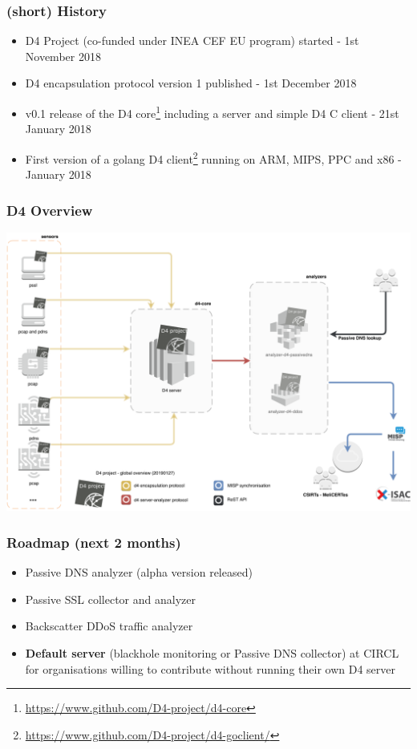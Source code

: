 \documentclass{beamer}
\begin{document}
\begin{frame}
        \frametitle{(short) History}
 \begin{itemize}
        \item D4 Project (co-funded under INEA CEF EU program) started - 1st November 2018
        \item D4 encapsulation protocol version 1 published  - 1st December 2018
        \item v0.1 release of the D4 core\footnote{\url{https://www.github.com/D4-project/d4-core}} including a server and simple D4 C client - 21st January 2018
        \item First version of a golang D4 client\footnote{\url{https://www.github.com/D4-project/d4-goclient/}} running on ARM, MIPS, PPC and x86 - January 2018
 \end{itemize}
\end{frame}

\begin{frame}
\frametitle{D4 Overview}
        \includegraphics[scale=0.41]{d4-overview.pdf}
\end{frame}

\begin{frame}
        \frametitle{Roadmap (next 2 months)}
        \begin{itemize}
                \item Passive DNS analyzer (alpha version released)
                \item Passive SSL collector and analyzer
                \item Backscatter DDoS traffic analyzer
                \item {\bf Default server} (blackhole monitoring or Passive DNS collector) at CIRCL for organisations willing to contribute without running their own D4 server
        \end{itemize}
\end{frame}
\end{document}

